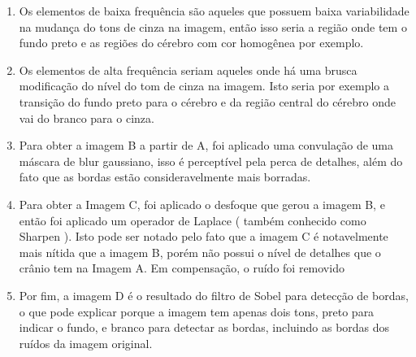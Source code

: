 \begin{question}

    \begin{enumerate}[label=\textbf{\alph*})]
		\item Os elementos de baixa frequência são aqueles que possuem 
		baixa variabilidade na mudança do tons de cinza na imagem, então isso seria 
		a região onde tem o fundo preto e as regiões do cérebro com cor homogênea por exemplo.
  		\item Os elementos de alta frequência seriam aqueles onde há uma brusca modificação 
        do nível do tom de cinza na imagem. Isto seria por exemplo a transição do fundo preto 
		para o cérebro e da região central do cérebro onde vai do branco para o cinza. 
    	\item Para obter a imagem B a partir de A, foi aplicado uma convulação de uma máscara 
        de blur gaussiano, isso é perceptível pela perca de detalhes, além do fato que 
		as bordas estão consideravelmente mais borradas.
        \item Para obter a Imagem C, foi aplicado o desfoque que gerou a imagem B, e então 
        foi aplicado um operador de Laplace ( também conhecido como Sharpen ). Isto pode ser notado 
		pelo fato que a imagem C é notavelmente mais nítida que a imagem B, porém não possui 
		o nível de detalhes que o crânio tem na Imagem A. Em compensação, o ruído foi removido
        \item Por fim, a imagem D é o resultado do filtro de Sobel para detecção de bordas, o que 
        pode explicar porque a imagem tem apenas dois tons, preto para indicar o fundo, e branco 
		para detectar as bordas, incluindo as bordas dos ruídos da imagem original. 
	\end{enumerate}
    
\end{question}